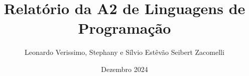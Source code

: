 \documentclass{article}
\title{Relatório da A2 de Linguagens de Programação}
\author{Leonardo Verissimo, Stephany e Sílvio Estêvão Seibert Zacomelli}
\date{Dezembro 2024}
\begin{document}
\maketitle
\tableofcontents
\pagebreak


    





\end{document}
